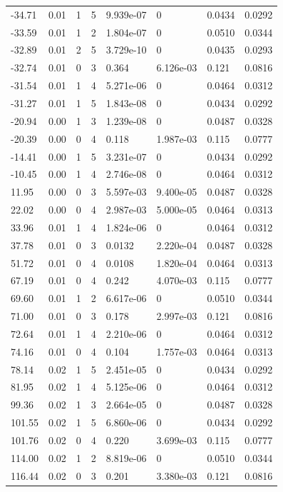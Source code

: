 \documentclass[preview]{standalone}
\begin{document}
{{\begin{tabular}{L{1.2cm}C{1.2cm} C{0.3cm}C{0.5cm} C{1.4cm}C{1.4cm} C{1.4cm}C{1.4cm}}
  -34.71  &  0.01  & 1     &  5 &  9.939e-07  & 0  & 0.0434 &  0.0292   \\ 
  -33.59  &  0.01  & 1     &  2 &  1.804e-07  & 0  & 0.0510 &  0.0344   \\ 
  -32.89  &  0.01  & 2     &  5 &  3.729e-10  & 0  & 0.0435 &  0.0293   \\ 
  -32.74  &  0.01  & 0     &  3 &  0.364  & 6.126e-03  & 0.121 &  0.0816   \\ 
  -31.54  &  0.01  & 1     &  4 &  5.271e-06  & 0  & 0.0464 &  0.0312   \\ 
  -31.27  &  0.01  & 1     &  5 &  1.843e-08  & 0  & 0.0434 &  0.0292   \\ 
  -20.94  &  0.00  & 1     &  3 &  1.239e-08  & 0  & 0.0487 &  0.0328   \\ 
  -20.39  &  0.00  & 0     &  4 &  0.118  & 1.987e-03  & 0.115 &  0.0777   \\ 
  -14.41  &  0.00  & 1     &  5 &  3.231e-07  & 0  & 0.0434 &  0.0292   \\ 
  -10.45  &  0.00  & 1     &  4 &  2.746e-08  & 0  & 0.0464 &  0.0312   \\ 
  11.95  &  0.00  & 0     &  3 &  5.597e-03  & 9.400e-05  & 0.0487 &  0.0328   \\ 
  22.02  &  0.00  & 0     &  4 &  2.987e-03  & 5.000e-05  & 0.0464 &  0.0313   \\ 
  33.96  &  0.01  & 1     &  4 &  1.824e-06  & 0  & 0.0464 &  0.0312   \\ 
  37.78  &  0.01  & 0     &  3 &  0.0132  & 2.220e-04  & 0.0487 &  0.0328   \\ 
  51.72  &  0.01  & 0     &  4 &  0.0108  & 1.820e-04  & 0.0464 &  0.0313   \\ 
  67.19  &  0.01  & 0     &  4 &  0.242  & 4.070e-03  & 0.115 &  0.0777   \\ 
  69.60  &  0.01  & 1     &  2 &  6.617e-06  & 0  & 0.0510 &  0.0344   \\ 
  71.00  &  0.01  & 0     &  3 &  0.178  & 2.997e-03  & 0.121 &  0.0816   \\ 
  72.64  &  0.01  & 1     &  4 &  2.210e-06  & 0  & 0.0464 &  0.0312   \\ 
  74.16  &  0.01  & 0     &  4 &  0.104  & 1.757e-03  & 0.0464 &  0.0313   \\ 
  78.14  &  0.02  & 1     &  5 &  2.451e-05  & 0  & 0.0434 &  0.0292   \\ 
  81.95  &  0.02  & 1     &  4 &  5.125e-06  & 0  & 0.0464 &  0.0312   \\ 
  99.36  &  0.02  & 1     &  3 &  2.664e-05  & 0  & 0.0487 &  0.0328   \\ 
  101.55  &  0.02  & 1     &  5 &  6.860e-06  & 0  & 0.0434 &  0.0292   \\ 
  101.76  &  0.02  & 0     &  4 &  0.220  & 3.699e-03  & 0.115 &  0.0777   \\ 
  114.00  &  0.02  & 1     &  2 &  8.819e-06  & 0  & 0.0510 &  0.0344   \\ 
  116.44  &  0.02  & 0     &  3 &  0.201  & 3.380e-03  & 0.121 &  0.0816   \\ 
\hline 
\end{tabular} 

}}
\end{document}
